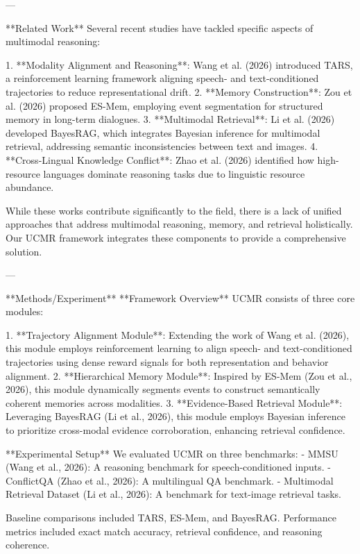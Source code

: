 ---

**Related Work**  
Several recent studies have tackled specific aspects of multimodal reasoning:  

1. **Modality Alignment and Reasoning**: Wang et al. (2026) introduced TARS, a reinforcement learning framework aligning speech- and text-conditioned trajectories to reduce representational drift.  
2. **Memory Construction**: Zou et al. (2026) proposed ES-Mem, employing event segmentation for structured memory in long-term dialogues.  
3. **Multimodal Retrieval**: Li et al. (2026) developed BayesRAG, which integrates Bayesian inference for multimodal retrieval, addressing semantic inconsistencies between text and images.  
4. **Cross-Lingual Knowledge Conflict**: Zhao et al. (2026) identified how high-resource languages dominate reasoning tasks due to linguistic resource abundance.  

While these works contribute significantly to the field, there is a lack of unified approaches that address multimodal reasoning, memory, and retrieval holistically. Our UCMR framework integrates these components to provide a comprehensive solution.  

---

**Methods/Experiment**  
**Framework Overview**  
UCMR consists of three core modules:  

1. **Trajectory Alignment Module**: Extending the work of Wang et al. (2026), this module employs reinforcement learning to align speech- and text-conditioned trajectories using dense reward signals for both representation and behavior alignment.  
2. **Hierarchical Memory Module**: Inspired by ES-Mem (Zou et al., 2026), this module dynamically segments events to construct semantically coherent memories across modalities.  
3. **Evidence-Based Retrieval Module**: Leveraging BayesRAG (Li et al., 2026), this module employs Bayesian inference to prioritize cross-modal evidence corroboration, enhancing retrieval confidence.  

**Experimental Setup**  
We evaluated UCMR on three benchmarks:  
- MMSU (Wang et al., 2026): A reasoning benchmark for speech-conditioned inputs.  
- ConflictQA (Zhao et al., 2026): A multilingual QA benchmark.  
- Multimodal Retrieval Dataset (Li et al., 2026): A benchmark for text-image retrieval tasks.  

Baseline comparisons included TARS, ES-Mem, and BayesRAG. Performance metrics included exact match accuracy, retrieval confidence, and reasoning coherence.  

